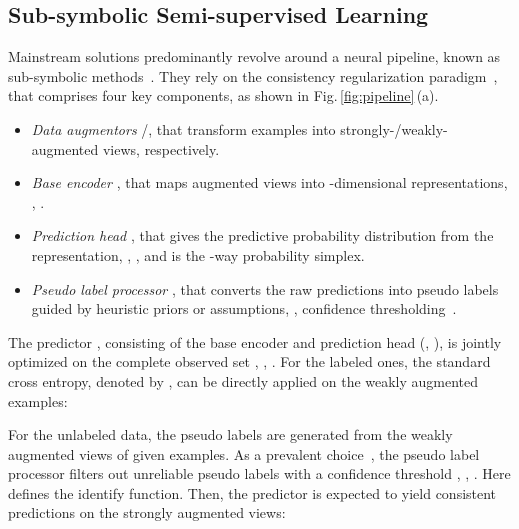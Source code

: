 \documentclass[10pt,twocolumn,letterpaper]{article}
\begin{document}
\subsection{Sub-symbolic Semi-supervised Learning}\label{sec:meth:ssl}
\noindent Mainstream solutions predominantly revolve around a neural pipeline, known as sub-symbolic methods~\cite{garcez2019neural}. 
They rely on the consistency regularization paradigm~\cite{sohn2020fixmatch,chen2021semi}, that comprises four key components, as shown in Fig.\,\ref{fig:pipeline}\,(a).
\begin{itemize}[leftmargin=*]
   \setlength{\itemsep}{0pt}
   \setlength{\parsep}{-2pt}
   \setlength{\parskip}{-0pt}
   \setlength{\leftmargin}{-10pt}
   \vspace{-6pt}

   \item \textit{Data augmentors} /, that transform examples into strongly-/weakly-augmented views, respectively.
   \item \textit{Base encoder} , that maps augmented views into -dimensional representations, \ie, . 
   \item \textit{Prediction head} , that gives the predictive probability distribution from the representation, \ie, , and  is the -way probability simplex.
   \item \textit{Pseudo label processor} , that converts the raw predictions into pseudo labels guided by heuristic priors or assumptions, \eg, confidence thresholding~\cite{sohn2020fixmatch,berthelot2019mixmatch,berthelot2019remixmatch,zhang2021flexmatch}.

   \vspace{-6pt}
\end{itemize}
The predictor , consisting of the base encoder and prediction head (\ie, ), is jointly optimized on the complete observed set , \ie, .
For the labeled ones, the standard cross entropy, {denoted by }, can be directly applied on the weakly augmented examples:
\vspace{-3pt}

For the unlabeled data, the pseudo labels are generated from the weakly augmented views of given examples. As a prevalent choice~\cite{chen2021semi}, the pseudo label processor  filters out unreliable pseudo labels with a confidence threshold , \ie, . Here  defines the identify function. Then, the predictor  is expected to yield consistent predictions on the strongly augmented views:
\vspace{-3pt}
\end{document}
